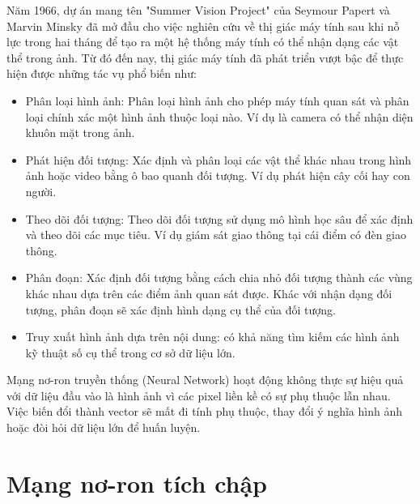 \documentclass[../the.tex]{subfiles}
\begin{document}
{\fontsize{13}{12} \selectfont

Năm 1966, dự án mang tên "Summer Vision Project" \cite{Papert1966TheSV} của Seymour Papert và Marvin Minsky  đã mở đầu cho việc nghiên cứu về thị giác máy tính sau khi nỗ lực trong hai tháng để tạo ra một hệ thống máy tính có thể
nhận dạng các vật thể trong ảnh. Từ đó đến nay, thị giác máy tính đã phát triển vượt bậc để thực hiện được những tác vụ phổ biến như:

\begin{itemize}
	\item Phân loại hình ảnh: Phân loại hình ảnh cho phép máy tính quan sát và phân loại chính xác một hình ảnh thuộc loại nào.
	      Ví dụ là camera có thể nhận diện khuôn mặt trong ảnh.

	\item Phát hiện đối tượng: Xác định và phân loại các vật thể khác nhau trong hình ảnh hoặc video bằng ô bao quanh đối tượng. Ví dụ phát hiện cây cối hay con người.

	\item Theo dõi đối tượng: Theo dõi đối tượng sử dụng mô hình học sâu để xác định và theo dõi các mục tiêu. Ví dụ giám sát giao thông tại cái điểm có đèn giao thông.

	\item Phân đoạn: Xác định đối tượng bằng cách chia nhỏ đối tượng thành các vùng khác nhau dựa trên các điểm ảnh quan sát được. Khác với nhận dạng đối tượng, phân đoạn sẽ xác định hình dạng cụ thể của đối tượng.

	\item Truy xuất hình ảnh dựa trên nội dung: có khả năng tìm kiếm các hình ảnh kỹ thuật số cụ thể trong cơ sở dữ liệu lớn.
\end{itemize}

}

{\fontsize{13}{12} \selectfont

Mạng nơ-ron truyền thống (Neural Network) hoạt động không thực sự hiệu quả với dữ liệu đầu vào là hình ảnh vì các pixel liền kề có sự phụ thuộc lẫn nhau.
Việc biến đổi thành vector sẽ mất đi tính phụ thuộc, thay đổi ý nghĩa hình ảnh hoặc đòi hỏi dữ liệu lớn để huấn luyện.

}

\section{Mạng nơ-ron tích chập }
\label{sec:cnn}
\end{document}

